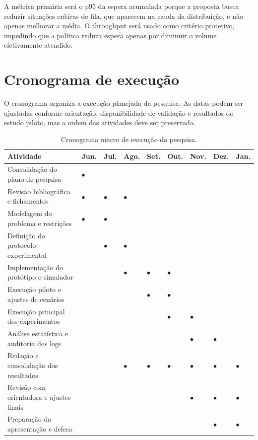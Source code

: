 \documentclass[
  12pt,
  oneside,
  a4paper,
  sumario=tradicional,
  brazil
]{abntex2}
\newcommand{\timeline}{\(\bullet\)}
\begin{document}
A m\'etrica prim\'aria ser\'a o p95 da espera acumulada porque a proposta busca reduzir situa\c{c}\~oes cr\'iticas de fila, que aparecem na cauda da distribui\c{c}\~ao, e n\~ao apenas melhorar a m\'edia. O throughput ser\'a usado como crit\'erio protetivo, impedindo que a pol\'itica reduza espera apenas por diminuir o volume efetivamente atendido.

\chapter{Cronograma de execu\c{c}\~ao}

O cronograma organiza a execu\c{c}\~ao planejada da pesquisa. As datas podem ser ajustadas conforme orienta\c{c}\~ao, disponibilidade de valida\c{c}\~ao e resultados do estudo piloto, mas a ordem das atividades deve ser preservada.

\begin{table}[H]
\centering
\setlength{\tabcolsep}{3pt}
\scriptsize
\renewcommand{\arraystretch}{1.15}
\begin{tabular}{@{}P{0.34\textwidth}*{8}{C{0.052\textwidth}}@{}}
\toprule
\textbf{Atividade} & \textbf{Jun.} & \textbf{Jul.} & \textbf{Ago.} & \textbf{Set.} & \textbf{Out.} & \textbf{Nov.} & \textbf{Dez.} & \textbf{Jan.} \\
\midrule
Consolida\c{c}\~ao do plano de pesquisa & \timeline &  &  &  &  &  &  &  \\
Revis\~ao bibliogr\'afica e fichamentos & \timeline & \timeline & \timeline &  &  &  &  &  \\
Modelagem do problema e restri\c{c}\~oes & \timeline & \timeline &  &  &  &  &  &  \\
Defini\c{c}\~ao do protocolo experimental &  & \timeline & \timeline &  &  &  &  &  \\
Implementa\c{c}\~ao do prot\'otipo e simulador &  &  & \timeline & \timeline & \timeline &  &  &  \\
Execu\c{c}\~ao piloto e ajustes de cen\'arios &  &  &  & \timeline & \timeline &  &  &  \\
Execu\c{c}\~ao principal dos experimentos &  &  &  &  & \timeline & \timeline &  &  \\
An\'alise estat\'istica e auditoria dos logs &  &  &  &  &  & \timeline & \timeline &  \\
Reda\c{c}\~ao e consolida\c{c}\~ao dos resultados &  &  & \timeline & \timeline & \timeline & \timeline & \timeline & \timeline \\
Revis\~ao com orientadora e ajustes finais &  &  &  &  &  & \timeline & \timeline & \timeline \\
Prepara\c{c}\~ao da apresenta\c{c}\~ao e defesa &  &  &  &  &  &  & \timeline & \timeline \\
\bottomrule
\end{tabular}
\caption{Cronograma macro de execu\c{c}\~ao da pesquisa.}
\end{table}
\end{document}
